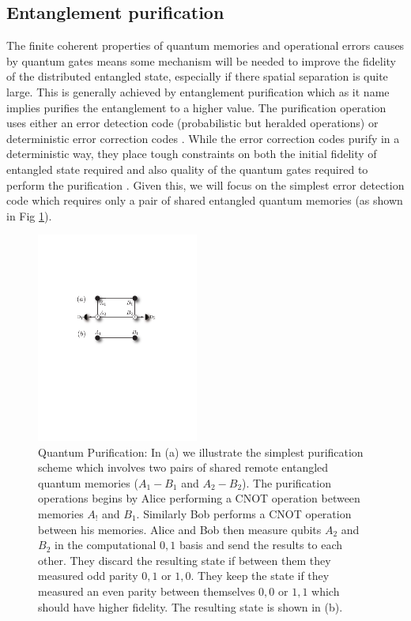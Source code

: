 \documentclass[twocolumn, aps, rmp, amsmath, amssymb, nofootinbib, superscriptaddress, longbibliography, floatfix, table-of-contents, eqsecnum]{revtex4-1}
\begin{document}
\subsection{Entanglement purification}

The finite coherent properties of quantum memories and operational errors causes by quantum gates means some mechanism will be needed to improve the fidelity of the distributed entangled state, especially if there spatial separation is quite large.  This is generally achieved by entanglement purification \cite{Bennett96,Deutsch98,dur98,pan01,dur07,Aschauer2004,jiang09,munro12,Stephens2013} which  as it name implies purifies the entanglement to a higher value. The purification operation uses either an error detection code (probabilistic but heralded operations) \cite{Bennett96,Deutsch98,dur98} or deterministic error correction codes \cite{Aschauer2004,jiang09,munro12}. While the error correction codes purify in a deterministic way, they place tough constraints on both the initial fidelity of entangled state required and also quality of the quantum gates required to perform the purification \cite{Aschauer2004}. Given this, we will focus on the simplest error detection code which requires only a pair of shared entangled quantum memories (as shown in Fig \ref{fig4}). 


\begin{figure}[!htb]
\begin{center}
\includegraphics[width=0.475\textwidth]{repeaters_4}
\end{center}
\caption{Quantum Purification: In (a) we illustrate the simplest purification scheme which involves two pairs of shared remote entangled quantum memories ($A_1-B_1$ and $A_2-B_2$). The purification operations begins by Alice performing a CNOT operation between memories $A_!$ and $B_1$. Similarly Bob performs a  CNOT operation between his memories. Alice and Bob then measure qubits $A_2$ and $B_2$ in the computational $0,1$ basis and send the results to each other. They discard the resulting state if between them they measured odd parity $0,1$ or $1,0$. They keep the state if they measured an even parity between themselves $0,0$ or $1,1$ which should have higher fidelity. The resulting state is shown in (b).  } 
\label{fig4}
\end{figure} 
\end{document}
